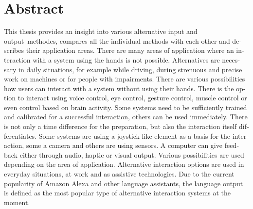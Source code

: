 \chapter{Abstract}

\begin{english} %
%
This thesis provides an insight into various alternative input and \mbox{output methodes,} \mbox{compares} all the individual methods with each other and describes their application areas.
\newline \newline
There are many areas of application where an interaction with a system using the hands is not possible. Alternatives are necessary in daily situations, for example while driving, during strenuous and precise work on machines or for people with impairments.
\newline \newline
There are various possibilities how users can interact with a system without using their hands. There is the option to interact using voice control, eye control, gesture control, muscle control or even control based on brain activity. Some systems need to be sufficiently trained and calibrated for a successful interaction, others can be used \mbox{immediately}. There is not only a time difference for the preparation, but also the \mbox{interaction} itself differentiates. Some systems are using a joystick-like element as a \mbox{basis} for the interaction, some a camera and others are using sensors. 
\newline \newline
A computer can give feedback either through audio, haptic or visual output. \mbox{Various} possibilities are used depending on the area of application.
\newline \newline
Alternative interaction options are used in everyday situations, at work and as \mbox{assistive} technologies. Due to the current popularity of Amazon Alexa and other language \mbox{assistants}, the language output is defined as the most popular type of alternative \mbox{interaction} systems at the moment.
%
\end{english}


